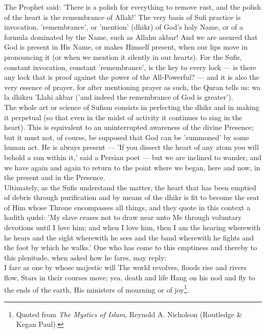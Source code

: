 \documentclass[11pt, b5paper, twoside]{book}
\begin{document}
The Prophet said: 'There is a polish for everything to remove rust, and the polish of the heart is 
the remembrance of Allah!' The very basis of Sufi practice is invocation, 'remembrance', or 'mention' 
(dhikr) of God's holy Name, or of a formula dominated by the Name, such as Allahu akbar! And we are 
assured that God is present in His Name, or makes Himself present, when our lips move in pronouncing 
it (or when we mention it silently in our hearts). For the Sufis, constant invocation, constant 
'remembrance', is the key to every lock --- is there any lock that is proof against the power of the 
All-Powerful? --- and it is also the very essence of prayer, for after mentioning prayer as such, the 
Quran tells us: wa la dhikru 'Llahi akbar ('and indeed the remembrance of God is greater'). \\

The whole art or science of Sufism consists in perfecting the dhikr and in making it perpetual (so 
that even in the midst of activity it continues to sing in the heart). This is equivalent to an 
uninterrupted awareness of the divine Presence; but it must not, of course, be supposed that God can 
be 'summoned' by some human act. He is always present --- 'If you dissect the heart of any atom you 
will behold a sun within it,' said a Persian poet --- but we are inclined to wander, and we have again 
and again to return to the point where we began, here and now, in the present and in the Presence. \\

Ultimately, as the Sufis understand the matter, the heart that has been emptied of debris through 
purification and by means of the dhikr is fit to become the seat of Him whose Throne encompasses all 
things, and they quote in this context a hadith qudsi: 'My slave ceases not to draw near unto Me 
through voluntary devotions until I love him; and when I love him, then I am the hearing wherewith he 
hears and the sight wherewith he sees and the band wherewith he fights and the foot by which he 
walks.' One who has come to this emptiness and thereby to this plenitude, when asked how he fares, 
may reply: \\

I fare as one by whose majestic will The world revolves, floods rise and rivers flow, Stars in their 
courses move; yea, death and life Hang on his nod and fly to the ends of the earth, His ministers of 
mourning or of joy\footnote{Quoted from \emph{The Mystics of Islam}, Reynold A. Nicholson (Routledge \& Kegan Paul).}.
\end{document}
